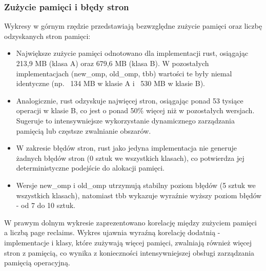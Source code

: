 \subsubsection{Zużycie pamięci i błędy stron}
Wykresy w górnym rzędzie przedstawiają bezwzględne zużycie pamięci oraz liczbę odzyskanych stron pamięci:
\begin{itemize}
    \item Największe zużycie pamięci odnotowano dla implementacji rust, osiągając 213,9 MB (klasa A) oraz 679,6 MB (klasa B). W pozostałych implementacjach (new\_omp, old\_omp, tbb) wartości te były niemal identyczne (np. ~134 MB w klasie A i ~530 MB w klasie B).
    \item Analogicznie, rust odzyskuje najwięcej stron, osiągając ponad 53 tysiące operacji w klasie B, co jest o ponad 50\% więcej niż w pozostałych wersjach. Sugeruje to intensywniejsze wykorzystanie dynamicznego zarządzania pamięcią lub częstsze zwalnianie obszarów.
    \item W zakresie błędów stron, rust jako jedyna implementacja nie generuje żadnych błędów stron (0 sztuk we wszystkich klasach), co potwierdza jej deterministyczne podejście do alokacji pamięci.
    \item Wersje new\_omp i old\_omp utrzymują stabilny poziom błędów (5 sztuk we wszystkich klasach), natomiast tbb wykazuje wyraźnie wyższy poziom błędów - od 7 do 10 sztuk.
\end{itemize}
W prawym dolnym wykresie zaprezentowano korelację między zużyciem pamięci a liczbą page reclaims. Wykres ujawnia wyraźną korelację dodatnią - implementacje i klasy, które zużywają więcej pamięci, zwalniają również więcej stron z pamięcią, co wynika z konieczności intensywniejszej obsługi zarządzania pamięcią operacyjną.

